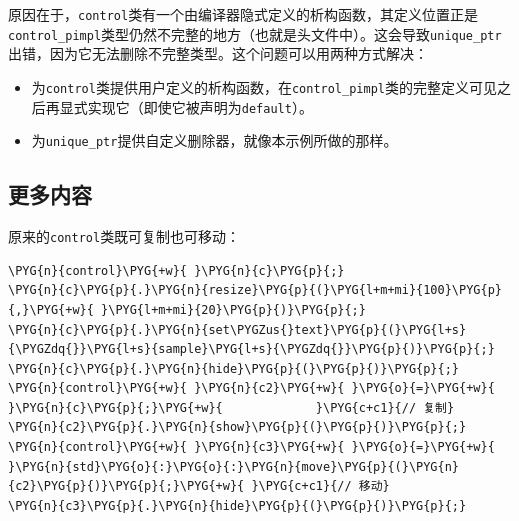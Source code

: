 
原因在于，\texttt{control}类有一个由编译器隐式定义的析构函数，其定义位置正是\texttt{control\_\allowbreak{}pimpl}类型仍然不完整的地方（也就是头文件中）。这会导致\texttt{unique\_\allowbreak{}ptr}出错，因为它无法删除不完整类型。这个问题可以用两种方式解决：



\begin{itemize}
\item 为\texttt{control}类提供用户定义的析构函数，在\texttt{control\_\allowbreak{}pimpl}类的完整定义可见之后再显式实现它（即使它被声明为\texttt{default}）。



\item 为\texttt{unique\_\allowbreak{}ptr}提供自定义删除器，就像本示例所做的那样。

\end{itemize}



\subsection{更多内容}



原来的\texttt{control}类既可复制也可移动：



\begin{codeblockbg}
\begin{Verbatim}[commandchars=\\\{\},breaklines=true,breakanywhere=true,fontsize=\codefont,xleftmargin=17bp]
\PYG{n}{control}\PYG{+w}{ }\PYG{n}{c}\PYG{p}{;}
\PYG{n}{c}\PYG{p}{.}\PYG{n}{resize}\PYG{p}{(}\PYG{l+m+mi}{100}\PYG{p}{,}\PYG{+w}{ }\PYG{l+m+mi}{20}\PYG{p}{)}\PYG{p}{;}
\PYG{n}{c}\PYG{p}{.}\PYG{n}{set\PYGZus{}text}\PYG{p}{(}\PYG{l+s}{\PYGZdq{}}\PYG{l+s}{sample}\PYG{l+s}{\PYGZdq{}}\PYG{p}{)}\PYG{p}{;}
\PYG{n}{c}\PYG{p}{.}\PYG{n}{hide}\PYG{p}{(}\PYG{p}{)}\PYG{p}{;}
\PYG{n}{control}\PYG{+w}{ }\PYG{n}{c2}\PYG{+w}{ }\PYG{o}{=}\PYG{+w}{ }\PYG{n}{c}\PYG{p}{;}\PYG{+w}{             }\PYG{c+c1}{// 复制}
\PYG{n}{c2}\PYG{p}{.}\PYG{n}{show}\PYG{p}{(}\PYG{p}{)}\PYG{p}{;}
\PYG{n}{control}\PYG{+w}{ }\PYG{n}{c3}\PYG{+w}{ }\PYG{o}{=}\PYG{+w}{ }\PYG{n}{std}\PYG{o}{:}\PYG{o}{:}\PYG{n}{move}\PYG{p}{(}\PYG{n}{c2}\PYG{p}{)}\PYG{p}{;}\PYG{+w}{ }\PYG{c+c1}{// 移动}
\PYG{n}{c3}\PYG{p}{.}\PYG{n}{hide}\PYG{p}{(}\PYG{p}{)}\PYG{p}{;}
\end{Verbatim}
\end{codeblockbg}


